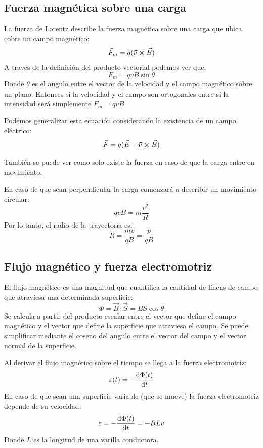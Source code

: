 \documentclass[arial,a4paper,print]{article}
\begin{document}
\subsection{Fuerza magnética sobre una carga}
La fuerza de Lorentz describe la fuerza magnética sobre una carga que ubica cobre un campo magnético:
\begin{equation*}
	\vec{F}_{m} = q(\vec{v}\cross\vec{B})
\end{equation*}
A través de la definición del producto vectorial podemos ver que:
\begin{equation*}
	F_{m} = qvB\sin\theta 
\end{equation*}
Donde $\theta$ es el angulo entre el vector de la velocidad y el campo magnético sobre un plano.
Entonces si la velocidad y el campo son ortogonales entre si la intensidad será simplemente $F_{m}=qvB$. 

Podemos generalizar esta ecuación considerando la existencia de un campo eléctrico:
\begin{equation*}
	\vec{F} = q(\vec{E} + \vec{v}\cross\vec{B})
\end{equation*}

También se puede ver como solo existe la fuerza en caso de que la carga entre en movimiento.

En caso de que sean perpendicular la carga comenzará a describir un movimiento circular:
\begin{equation*}
	qvB=m\frac{v^{2}}{R}
\end{equation*}
Por lo tanto, el radio de la trayectoria es:
\begin{equation*}
	R=\frac{mv}{qB} = \frac{p}{qB}
\end{equation*}

\subsection{Flujo magnético y fuerza electromotriz}

El flujo magnético es una magnitud que cuantifica la cantidad de líneas de campo que atraviesa una determinada superficie:
\begin{equation*}
	\Phi = \vec{B}\cdot\vec{S} = BS\cos\theta
\end{equation*}
Se calcula a partir del producto escalar entre el vector que define el campo magnético y el vector que define la superficie que atraviesa el campo. Se puede simplificar mediante el coseno del angulo entre el vector del campo y el vector normal de la superficie. 

Al derivar el flujo magnético sobre el tiempo se llega a la fuerza electromotriz:
\begin{equation*}
	\varepsilon(t) = -\dv{\Phi(t)}{t}
\end{equation*}
En caso de que sean una superficie variable (que se mueve) la fuerza electromotriz depende de su velocidad:
\begin{equation*}
	\varepsilon = -\dv{\Phi(t)}{t} = -BLv
\end{equation*}
Donde $L$ es la longitud de una varilla conductora. 
\end{document}
